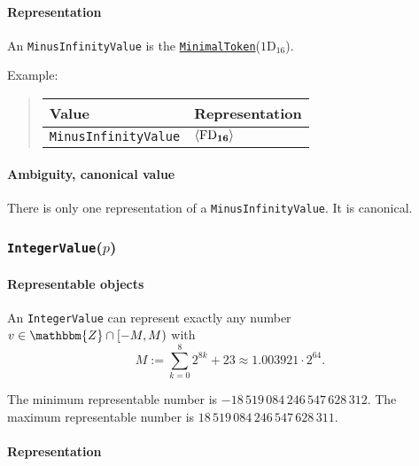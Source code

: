 \documentclass[headings=normal, headsepline, numbers=noenddot, fleqn, a4paper]{scrartcl}
\newcommand{\HexNumber}[1]{\mathrm{#1}_{16}}
\newcommand{\DborSyntaxIdent}[1]{\texttt{#1}}
\newcommand{\DborSyntaxIdentRef}[1]{\hyperlink{sec:def:#1}{\DborSyntaxIdent{#1}}}
\newcommand{\DborFirstByte}[2]{\mathbf{\textcolor{#1}{\HexNumber{#2}}}}
\newcommand{\DborFirstByteNumber}[1]{\DborFirstByte{black}{#1}}
\begin{document}
    \paragraph{Representation}

    An \DborSyntaxIdent{MinusInfinityValue} is the \DborSyntaxIdentRef{MinimalToken}($\HexNumber{1D}$).

    \smallskip
    \noindent
    Example:
    \nolinebreak
    \begin{quote}    
        \begin{tabular}{ll}
            \toprule
            Value & Representation \\
            \midrule
            \DborSyntaxIdent{MinusInfinityValue} 
                & $\langle \DborFirstByteNumber{FD} \rangle$ \\
            \bottomrule
        \end{tabular}
    \end{quote}

    \paragraph{Ambiguity, canonical value}

    There is only one representation of a \DborSyntaxIdent{MinusInfinityValue}.
    It is canonical.


    \subsubsection{\DborSyntaxIdent{IntegerValue}($p$)}
    \hypertarget{sec:def:IntegerValue}{}

    \paragraph{Representable objects}

    An \DborSyntaxIdent{IntegerValue} can represent exactly any number $v \in \mathbbm{Z} \cap [-M, M)$ with
    \begin{equation}
        M := \sum_{k = 0}^8 2^{8k} + 23 \approx 1.003921 \cdot 2^{64}.
    \end{equation}%

    \smallskip
    The minimum representable number is $-18\,519\,084\,246\,547\,628\,312$.
    The maximum representable number is $18\,519\,084\,246\,547\,628\,311$.

    \paragraph{Representation}
\end{document}
